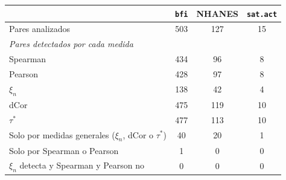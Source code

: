 \begin{tabular}{lccc}
\toprule
 & \texttt{bfi} & NHANES & \texttt{sat.act} \\
\midrule
Pares analizados & 503 & 127 & 15 \\
\midrule
\multicolumn{4}{l}{\emph{Pares detectados por cada medida}} \\
Spearman & 434 & 96 & 8 \\
Pearson & 428 & 97 & 8 \\
$\xi_n$ & 138 & 42 & 4 \\
dCor & 475 & 119 & 10 \\
$\tau^*$ & 477 & 113 & 10 \\
\midrule
Solo por medidas generales ($\xi_n$, dCor o $\tau^*$) & 40 & 20 & 1 \\
Solo por Spearman o Pearson & 1 & 0 & 0 \\
$\xi_n$ detecta y Spearman y Pearson no & 0 & 0 & 0 \\
\bottomrule
\end{tabular}
